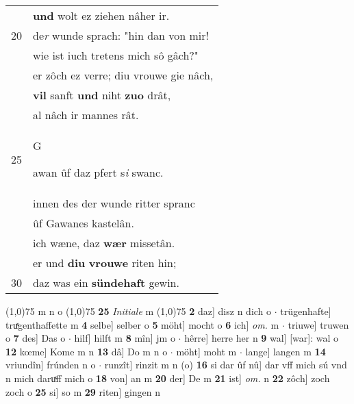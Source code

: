 \documentclass[8pt,a4paper,notitlepage]{article}
\begin{document}
\begin{table}[ht]
\begin{minipage}[t]{0.5\linewidth}
\begin{tabular}{rl}
 & \textbf{und} wolt ez ziehen nâher ir.\\ 
20 & de\textit{r} wunde sprach: "hin dan von mir!\\ 
 & wie ist iuch tretens mich sô gâch?"\\ 
 & er zôch ez verre; diu vrouwe gie nâch,\\ 
 & \textbf{vil} sanft \textbf{und} niht \textbf{zuo} drât,\\ 
 & al nâch ir mannes rât.\\ 
25 & \begin{large}G\end{large}awan ûf daz pfert s\textit{i} swanc.\\ 
 & innen des der wunde ritter spranc\\ 
 & ûf Gawanes kastelân.\\ 
 & ich wæne, daz \textbf{wær} missetân.\\ 
 & er und \textbf{diu} \textbf{vrouwe} riten hin;\\ 
30 & daz was ein \textbf{sündehaft} gewin.\\ 
\end{tabular}
\scriptsize
\line(1,0){75} \newline
m n o \newline
\line(1,0){75} \newline
\textbf{25} \textit{Initiale} m  \newline
\line(1,0){75} \newline
\textbf{2} daz] disz n dich o  $\cdot$ trügenhafte] truͯgenthaffette m \textbf{4} selbe] selber o \textbf{5} möht] mocht o \textbf{6} ich] \textit{om.} m  $\cdot$ triuwe] truwen o \textbf{7} des] Das o  $\cdot$ hilf] hilft m \textbf{8} mîn] jm o  $\cdot$ hêrre] herre her n \textbf{9} wal] [war]: wal o \textbf{12} kœme] Kome m n \textbf{13} dâ] Do m n o  $\cdot$ möht] moht m  $\cdot$ lange] langen m \textbf{14} vriundîn] frúnden n o  $\cdot$ runzît] rinzit m n (o) \textbf{16} si dar ûf nû] dar vff mich sú vnd n mich daruͯff mich o \textbf{18} von] an m \textbf{20} der] De m \textbf{21} ist] \textit{om.} n \textbf{22} zôch] zoch zoch o \textbf{25} si] so m \textbf{29} riten] gingen n \newline
\end{minipage}
\end{table}
\newpage
\end{document}
